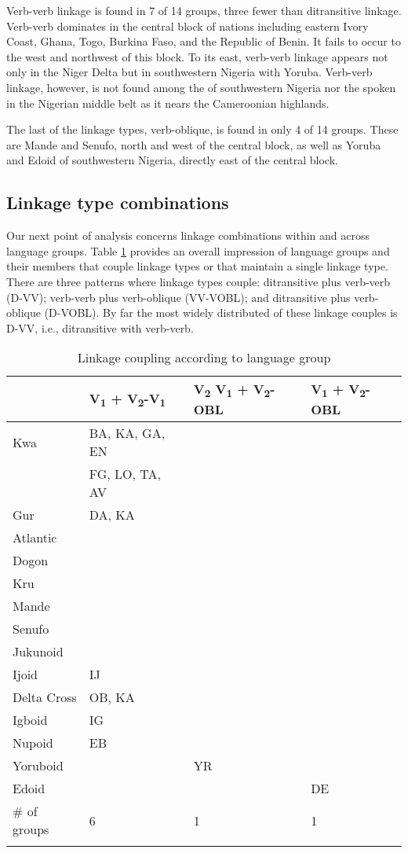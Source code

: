 \documentclass[output=paper,colorlinks,citecolor=brown]{langscibook}
\begin{document}
Verb-verb linkage is found in 7 of 14 groups, three fewer than ditransitive linkage. Verb-verb dominates in the central block of nations including eastern Ivory Coast, Ghana, Togo, Burkina Faso, and the Republic of Benin. It fails to occur to the west and northwest of this block. To its east, verb-verb linkage appears not only in the Niger Delta but in southwestern Nigeria with Yoruba. Verb-verb linkage, however, is not found among the  of southwestern Nigeria nor the  spoken in the Nigerian middle belt as it nears the Cameroonian highlands.


The last of the linkage types, verb-oblique, is found in only 4 of 14 groups. These are Mande and Senufo, north and west of the central block, as well as Yoruba and Edoid of southwestern Nigeria, directly east of the central block.

\subsection{Linkage type combinations}

Our next point of analysis concerns linkage combinations within and across language groups. Table \ref{tab:LinkageCoupling} provides an overall impression of language groups and their members that couple linkage types or that maintain a single linkage type. There are three patterns where linkage types couple: ditransitive plus verb-verb (D-VV); verb-verb plus verb-oblique (VV-VOBL); and ditransitive plus verb-oblique (D-VOBL). By far the most widely distributed of these linkage couples is D-VV, i.e., ditransitive with verb-verb.

\begin{table}
\caption{Linkage coupling according to language group}
\label{tab:LinkageCoupling}
 \begin{tabular}{llll}
  \lsptoprule
 & V\textsubscript{1} + V\textsubscript{2}-V\textsubscript{1} & V\textsubscript{2} V\textsubscript{1} + V\textsubscript{2}-OBL & V\textsubscript{1} + V\textsubscript{2}-OBL  \\
\midrule
Kwa	&  BA, KA, GA, EN		& & \\
	&FG, LO, TA, AV	&& \\	
Gur &	DA, KA		&& \\
Atlantic		&&& \\	
Dogon 			&&&\\
Kru 			&&&\\
Mande			&&&\\
Senufo			&&&\\
Jukunoid			&&&\\
Ijoid &	IJ		 && \\
Delta Cross &	OB, KA		&& \\
Igboid & 	IG		&& \\
Nupoid	& EB		&& \\
Yoruboid & &	YR	& \\
Edoid 	& & &		DE\\
\midrule
\# of groups &	6	&1&	1\\
  \lspbottomrule
 \end{tabular}
\end{table}
\end{document}
